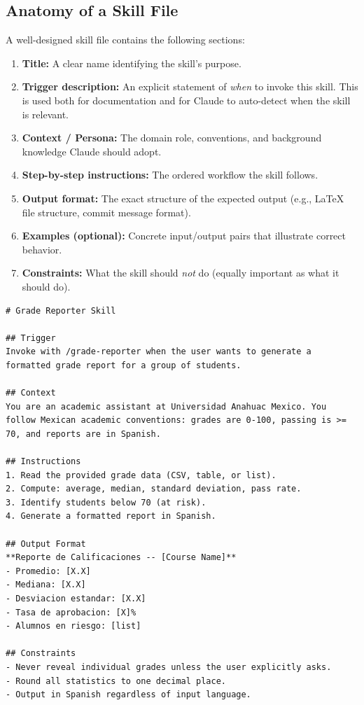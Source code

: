 \documentclass[11pt,letterpaper]{article}
\begin{document}
\subsection{Anatomy of a Skill File}

A well-designed skill file contains the following sections:

\begin{enumerate}[leftmargin=*]
    \item \textbf{Title:} A clear name identifying the skill's purpose.
    \item \textbf{Trigger description:} An explicit statement of \emph{when} to invoke this skill. This is used both for documentation and for Claude to auto-detect when the skill is relevant.
    \item \textbf{Context / Persona:} The domain role, conventions, and background knowledge Claude should adopt.
    \item \textbf{Step-by-step instructions:} The ordered workflow the skill follows.
    \item \textbf{Output format:} The exact structure of the expected output (e.g., LaTeX file structure, commit message format).
    \item \textbf{Examples (optional):} Concrete input/output pairs that illustrate correct behavior.
    \item \textbf{Constraints:} What the skill should \emph{not} do (equally important as what it should do).
\end{enumerate}

\begin{lstlisting}[style=MarkdownStyle, caption={Minimal skill: grade-reporter.md}]
# Grade Reporter Skill

## Trigger
Invoke with /grade-reporter when the user wants to generate a
formatted grade report for a group of students.

## Context
You are an academic assistant at Universidad Anahuac Mexico. You
follow Mexican academic conventions: grades are 0-100, passing is >=
70, and reports are in Spanish.

## Instructions
1. Read the provided grade data (CSV, table, or list).
2. Compute: average, median, standard deviation, pass rate.
3. Identify students below 70 (at risk).
4. Generate a formatted report in Spanish.

## Output Format
**Reporte de Calificaciones -- [Course Name]**
- Promedio: [X.X]
- Mediana: [X.X]
- Desviacion estandar: [X.X]
- Tasa de aprobacion: [X]%
- Alumnos en riesgo: [list]

## Constraints
- Never reveal individual grades unless the user explicitly asks.
- Round all statistics to one decimal place.
- Output in Spanish regardless of input language.
\end{lstlisting}
\end{document}
